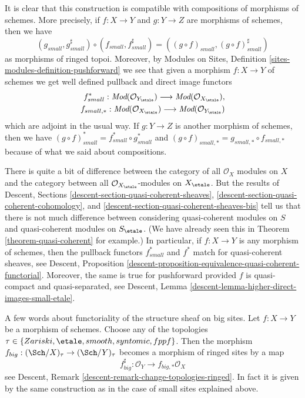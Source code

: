\medskip\noindent
It is clear that this construction is compatible with compositions of
morphisms of schemes. More precisely, if $f : X \to Y$ and $g : Y \to Z$
are morphisms of schemes, then we have
$$
(g_{small}, g_{small}^\sharp)
\circ
(f_{small}, f_{small}^\sharp)
=
((g \circ f)_{small}, (g \circ f)_{small}^\sharp)
$$
as morphisms of ringed topoi. Moreover, by
Modules on Sites, Definition \ref{sites-modules-definition-pushforward}
we see that given a morphism $f : X \to Y$ of schemes
we get well defined pullback and direct image functors
\begin{align*}
f_{small}^* :
\textit{Mod}(\mathcal{O}_{Y_\etale})
\longrightarrow
\textit{Mod}(\mathcal{O}_{X_\etale}), \\
f_{small, *} :
\textit{Mod}(\mathcal{O}_{X_\etale})
\longrightarrow
\textit{Mod}(\mathcal{O}_{Y_\etale})
\end{align*}
which are adjoint in the usual way. If $g : Y \to Z$ is another morphism
of schemes, then we have
$(g \circ f)_{small}^* = f_{small}^* \circ g_{small}^*$
and $(g \circ f)_{small, *} = g_{small, *} \circ f_{small, *}$
because of what we said about compositions.

\medskip\noindent
There is quite a bit of difference between the category
of all $\mathcal{O}_X$ modules on $X$ and the category between all
$\mathcal{O}_{X_\etale}$-modules on $X_\etale$. But the
results of
Descent, Sections \ref{descent-section-quasi-coherent-sheaves},
\ref{descent-section-quasi-coherent-cohomology}, and
\ref{descent-section-quasi-coherent-sheaves-bis}
tell us that there is not much difference between considering quasi-coherent
modules on $S$ and quasi-coherent modules on $S_\etale$.
(We have already seen this in
Theorem \ref{theorem-quasi-coherent}
for example.)
In particular, if $f : X \to Y$ is any morphism of schemes, then
the pullback functors $f_{small}^*$ and $f^*$ match for
quasi-coherent sheaves, see
Descent,
Proposition \ref{descent-proposition-equivalence-quasi-coherent-functorial}.
Moreover, the same is true for pushforward provided $f$ is
quasi-compact and quasi-separated, see
Descent, Lemma \ref{descent-lemma-higher-direct-images-small-etale}.

\medskip\noindent
A few words about functoriality of the structure sheaf on big sites.
Let $f : X \to Y$ be a morphism of schemes. Choose any of the
topologies $\tau \in \{Zariski,\linebreak[0]
\etale,\linebreak[0] smooth,\linebreak[0] syntomic,\linebreak[0]
fppf\}$. Then the morphism
$f_{big} : (\Sch/X)_\tau \to (\Sch/Y)_\tau$
becomes a morphism of ringed sites by a map
$$
f_{big}^\sharp : \mathcal{O}_Y \longrightarrow f_{big, *}\mathcal{O}_X
$$
see Descent, Remark \ref{descent-remark-change-topologies-ringed}.
In fact it is given by the same construction as in the case of small
sites explained above.












